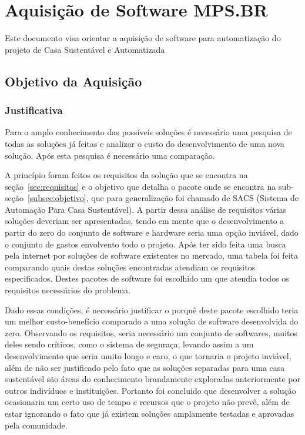 \chapter{Aquisição de Software MPS.BR}

\begin{center}
	Este documento visa orientar a aquisição de software para automatização do projeto de Casa Sustentável e Automatizada
	\end{center}

\section{Objetivo da Aquisição}

\subsection{Justificativa}

	Para o amplo conhecimento das possíveis soluções é necessário uma pesquisa de todas as soluções já feitas e analizar
	 o custo do desenvolvimento de uma nova solução. Após esta pesquisa é necessário uma comparação.

	A princípio foram feitos os requisitos da solução que se encontra na seção~\ref{sec:requisitos} e o objetivo que
	detalha o pacote onde se encontra na sub-seção~\ref{subsec:objetivo}, que para generalização foi chamado de SACS (Sistema de Automação Para Casa Sustentável). A
	partir dessa análise de requisitos várias soluções deveriam ser apresentadas, tendo em mente que o desenvolvimento
	a partir do zero do conjunto de software e hardware seria uma opção inviável, dado o conjunto de gastos envolvento
	todo o projeto. Após ter sido feita uma busca pela internet por soluções de software existentes no
	mercado, uma tabela foi feita comparando quais destas soluções encontradas atendiam os requisitos especificados.
	Destes pacotes de software foi escolhido um que atendia todos os requisitos necessários do problema.

	Dado essas condições, é necessário justificar o porquê deste pacote escolhido teria um melhor custo-benefício
	comparado a uma solução de software desenvolvida do zero. Observando os requisitos, seria necessário um conjunto
	de softwares, muitos deles sendo críticos, como o sistema de seguraça, levando assim a um desenvolvimento
	 que seria muito longo e caro, o que tornaria o projeto inviável, além de não ser justificado pelo fato que as
	 soluções separadas para uma casa sustentável são áreas do conhecimento brandamente exploradas anteriormente por
	 outros indivíduos e instituições. Portanto foi concluido que desenvolver a solução ocasionaria um certo uso de
	 tempo e recursos que o projeto não prevê, além de estar ignorando o fato que já existem soluções amplamente
	 testadas e aprovadas pela comunidade.


